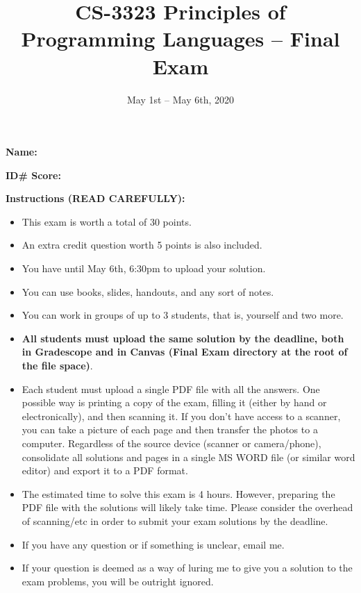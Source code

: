 \documentclass{article}
\title{CS-3323 Principles of Programming Languages -- Final Exam}
\begin{document}
\date{May 1st -- May 6th, 2020}

\maketitle
{\bf\large
Name: \underline{\mbox{\hspace{4cm}}} 
}
\vspace{2em}

{\bf\large
ID\# \underline{\mbox{\hspace{4cm}}} \hfill
Score: \underline{\mbox{\hspace{4cm}}}
}

\vspace{4em}

\noindent
{\bf Instructions (READ CAREFULLY):}

\begin{itemize}

\item
This exam is worth a total of 30 points. 

\item 
An extra credit question worth 5 points is also included. 

\item You have until May 6th, 6:30pm to upload your solution.

\item You can use books, slides, handouts, and any sort of notes.

\item You can work in groups of up to 3 students, that is, yourself and two more.

\item {\bf All students must upload the same solution by the deadline, both in Gradescope and in Canvas (Final Exam directory at the root of the file space)}.

\item Each student must upload a single PDF file with all the answers. One possible way is printing
a copy of the exam, filling it (either by hand or electronically), and then scanning it. If you don't
have access to a scanner, you can take a picture of each page and then transfer the photos to a computer.
Regardless of the source device (scanner or camera/phone), consolidate all solutions and pages in a single MS WORD file (or similar word editor)
and export it to a PDF format.

\item The estimated time to solve this exam is 4 hours. However, preparing the PDF file with the solutions will likely take time. Please consider the
overhead of scanning/etc in order to submit your exam solutions by the deadline.

\item If you have any question or if something is unclear, email me. 

\item If your question is deemed as a way of luring me to give you a solution to the exam problems, you will be outright ignored.


\end{itemize}
\end{document}

